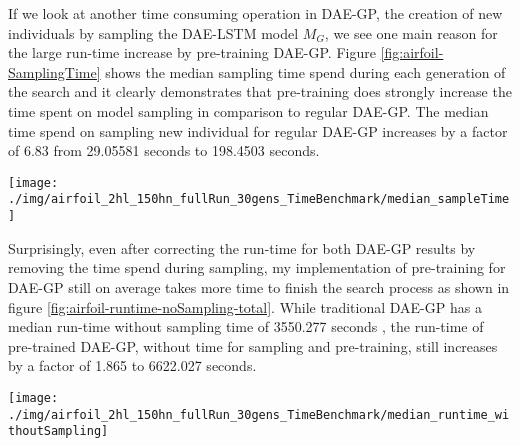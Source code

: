 \documentclass[
  11pt,
]{article}
\let\origfigure\figure
\let\endorigfigure\endfigure
\renewenvironment{figure}[1][2] {
    \expandafter\origfigure\expandafter[H]
} {
    \endorigfigure
}
\begin{document}
If we look at another time consuming operation in DAE-GP, the creation of new individuals by sampling the DAE-LSTM model \(M_G\), we see one main reason for the large run-time increase by pre-training DAE-GP. Figure \ref{fig:airfoil-SamplingTime} shows the median sampling time spend during each generation of the search and it clearly demonstrates that pre-training does strongly increase the time spent on model sampling in comparison to regular DAE-GP. The median time spend on sampling new individual for regular DAE-GP increases by a factor of 6.83 from 29.05581 seconds to 198.4503 seconds.

\begin{figure}[c]

{\centering \texttt{[image: ./img/airfoil\_2hl\_150hn\_fullRun\_30gens\_TimeBenchmark/median\_sampleTime]} 

}

\caption{Median Sampling Time per Generation - Airfoil}\label{fig:airfoil-SamplingTime}
\end{figure}

Surprisingly, even after correcting the run-time for both DAE-GP results by removing the time spend during sampling, my implementation of pre-training for DAE-GP still on average takes more time to finish the search process as shown in figure \ref{fig:airfoil-runtime-noSampling-total}. While traditional DAE-GP has a median run-time without sampling time of 3550.277 seconds , the run-time of pre-trained DAE-GP, without time for sampling and pre-training, still increases by a factor of 1.865 to 6622.027 seconds.

\begin{figure}[c]

{\centering \texttt{[image: ./img/airfoil\_2hl\_150hn\_fullRun\_30gens\_TimeBenchmark/median\_runtime\_withoutSampling]} 

}

\caption{Median Runtime excluding Time for Sampling - Airfoil}\label{fig:airfoil-runtime-noSampling-total}
\end{figure}
\end{document}
